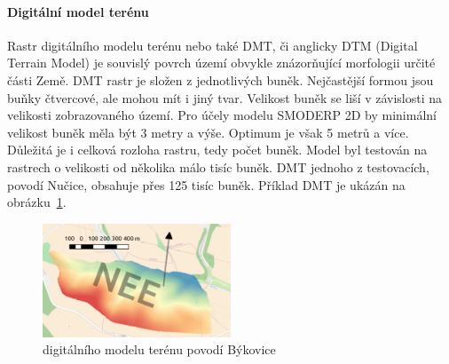 
\paragraph{Digitální model terénu} \label{sec:vstupdmt} 

Rastr digitálního modelu terénu nebo také DMT, či anglicky DTM (Digital Terrain Model) je souvislý povrch území obvykle znázorňující morfologii určité části Země. DMT rastr je složen z jednotlivých buněk. Nejčastější formou jsou buňky čtvercové, ale mohou mít i jiný tvar. Velikost buněk se liší v závislosti na velikosti zobrazovaného území. Pro účely modelu SMODERP 2D by minimální velikost buněk měla být 3 metry a výše. Optimum je však 5 metrů a více. Důležitá je i celková rozloha rastru, tedy počet buněk. Model byl testován na rastrech o velikosti od několika málo tisíc buněk. DMT jednoho z testovacích, povodí Nučice, obsahuje přes 125 tisíc buněk. Příklad DMT je ukázán na obrázku~\ref{fig:bykovicedmt}.

\begin{figure}
  \centering
  \includegraphics[width=0.5\textwidth]{./img/dmtbk.png}
  \caption{digitálního modelu terénu povodí Býkovice}
  \label{fig:bykovicedmt}
\end{figure}

